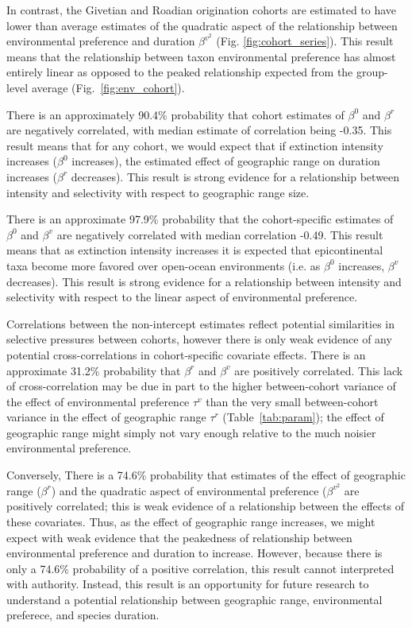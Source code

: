 \documentclass[11pt]{article}
\begin{document}
In contrast, the Givetian and Roadian origination cohorts are estimated to have lower than average estimates of the quadratic aspect of the relationship between environmental preference and duration \(\beta^{v^{2}}\) (Fig. \ref{fig:cohort_series}). This result means that the relationship between taxon environmental preference has almost entirely linear as opposed to the peaked relationship expected from the group-level average (Fig.~\ref{fig:env_cohort}).


There is an approximately 90.4\% probability that cohort estimates of \(\beta^{0}\) and \(\beta^{r}\) are negatively correlated, with median estimate of correlation being -0.35. This result means that for any cohort, we would expect that if extinction intensity increases (\(\beta^{0}\) increases), the estimated effect of geographic range on duration increases (\(\beta^{r}\) decreases). This result is strong evidence for a relationship between intensity and selectivity with respect to geographic range size.

There is an approximate 97.9\% probability that the cohort-specific estimates of \(\beta^{0}\) and \(\beta^{v}\) are negatively correlated with median correlation -0.49. This result means that as extinction intensity increases it is expected that epicontinental taxa become more favored over open-ocean environments (i.e. as \(\beta^{0}\) increases, \(\beta^{v}\) decreases). This result is strong evidence for a relationship between intensity and selectivity with respect to the linear aspect of environmental preference. 

Correlations between the non-intercept estimates reflect potential similarities in selective pressures between cohorts, however there is only weak evidence of any potential cross-correlations in cohort-specific covariate effects. There is an approximate 31.2\% probability that \(\beta^{r}\) and \(\beta^{v}\) are positively correlated. This lack of cross-correlation may be due in part to the higher between-cohort variance of the effect of environmental preference \(\tau^{v}\) than the very small between-cohort variance in the effect of geographic range \(\tau^{r}\) (Table~\ref{tab:param}); the effect of geographic range might simply not vary enough relative to the much noisier environmental preference. 

Conversely, There is a 74.6\% probability that estimates of the effect of geographic range (\(\beta^{r}\)) and the quadratic aspect of environmental preference (\(\beta^{v^{2}}\) are positively correlated; this is weak evidence of a relationship between the effects of these covariates. Thus, as the effect of geographic range increases, we might expect with weak evidence that the peakedness of relationship between environmental preference and duration to increase. However, because there is only a 74.6\% probability of a positive correlation, this result cannot interpreted with authority. Instead, this result is an opportunity for future research to understand a potential relationship between geographic range, environmental preferece, and species duration.
\end{document}
